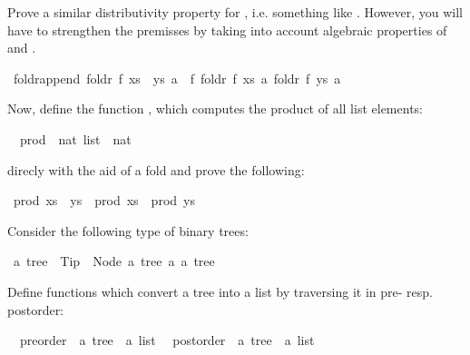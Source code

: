 \begin{isabellebody}
%
\begin{isamarkuptext}%
Prove a similar distributivity property for ,
i.e. something like . However, you will have to strengthen the premisses
by taking into account algebraic properties of  and .%
\end{isamarkuptext}%
\isamarkuptrue%
\ foldr{\isacharunderscore}append{\isacharcolon}\ {\isachardoublequote}foldr\ f\ {\isacharparenleft}xs\ {\isacharat}\ ys{\isacharparenright}\ a\ {\isacharequal}\ f\ {\isacharparenleft}foldr\ f\ xs\ a{\isacharparenright}\ {\isacharparenleft}foldr\ f\ ys\ a{\isacharparenright}{\isachardoublequote}\isamarkupfalse%
\isamarkupfalse%
%
\begin{isamarkuptext}%
Now, define the function , which computes the product of all list elements:%
\end{isamarkuptext}%
\isamarkuptrue%
\ \ prod\ {\isacharcolon}{\isacharcolon}\ {\isachardoublequote}nat\ list\ {\isasymRightarrow}\ nat{\isachardoublequote}\isamarkupfalse%
%
\begin{isamarkuptext}%
direcly with the aid of  a fold and prove the following:%
\end{isamarkuptext}%
\isamarkuptrue%
\ {\isachardoublequote}prod\ {\isacharparenleft}xs\ {\isacharat}\ ys{\isacharparenright}\ {\isacharequal}\ prod\ xs\ {\isacharasterisk}\ prod\ ys{\isachardoublequote}\isamarkupfalse%
\isamarkupfalse%
%
\isamarkuptrue%
%
\begin{isamarkuptext}%
Consider the following type of binary trees:%
\end{isamarkuptext}%
\isamarkuptrue%
\ {\isacharprime}a\ tree\ {\isacharequal}\ Tip\ {\isacharbar}\ Node\ {\isachardoublequote}{\isacharprime}a\ tree{\isachardoublequote}\ {\isacharprime}a\ {\isachardoublequote}{\isacharprime}a\ tree{\isachardoublequote}\isamarkupfalse%
%
\begin{isamarkuptext}%
Define functions which convert a tree into a list by traversing it in pre- resp. postorder:%
\end{isamarkuptext}%
\isamarkuptrue%
\ \ preorder\ {\isacharcolon}{\isacharcolon}\ {\isachardoublequote}{\isacharprime}a\ tree\ {\isasymRightarrow}\ {\isacharprime}a\ list{\isachardoublequote}\isanewline
\ \ postorder\ {\isacharcolon}{\isacharcolon}\ {\isachardoublequote}{\isacharprime}a\ tree\ {\isasymRightarrow}\ {\isacharprime}a\ list{\isachardoublequote}\isamarkupfalse%

\end{isabellebody}
